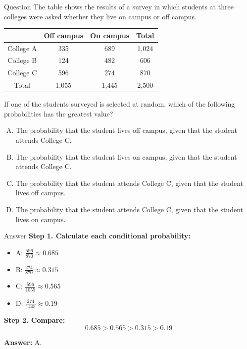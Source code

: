 \documentclass{beamer}
\begin{document}
\begin{frame}{Question}
\small
The table shows the results of a survey in which students at three colleges were asked whether they live on campus or off campus.

\begin{center}
\begin{tabular}{|c|c|c|c|}
\hline
 & Off campus & On campus & Total \\
\hline
College A & 335 & 689 & 1,024 \\
College B & 124 & 482 & 606 \\
College C & 596 & 274 & 870 \\
\hline
Total & 1,055 & 1,445 & 2,500 \\
\hline
\end{tabular}
\end{center}

If one of the students surveyed is selected at random, which of the following probabilities has the greatest value?

\begin{enumerate}[A.]
    \item The probability that the student lives off campus, given that the student attends College C.
    \item The probability that the student lives on campus, given that the student attends College C.
    \item The probability that the student attends College C, given that the student lives off campus.
    \item The probability that the student attends College C, given that the student lives on campus.
\end{enumerate}
\end{frame}


\begin{frame}{Answer}
\textbf{Step 1. Calculate each conditional probability:}

\begin{itemize}
    \item A: $\frac{596}{870} \approx 0.685$
    \item B: $\frac{274}{870} \approx 0.315$
    \item C: $\frac{596}{1055} \approx 0.565$
    \item D: $\frac{274}{1445} \approx 0.19$
\end{itemize}

\textbf{Step 2. Compare:}
\[
0.685 > 0.565 > 0.315 > 0.19
\]

\textbf{Answer:} A.
\end{frame}
\end{document}
